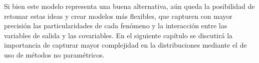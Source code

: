 Si bien este modelo representa una buena alternativa, a\'un queda la posibilidad de retomar estas ideas y crear modelos m\'as flexibles, que capturen con mayor precisi\'on las particularidades de cada fen\'omeno y la interacci\'on entre las variables de salida y las covariables. En el siguiente cap\'itulo se discutir\'a la importancia de capturar mayor complejidad en la distribuciones mediante el de uso de m\'etodos no param\'etricos.